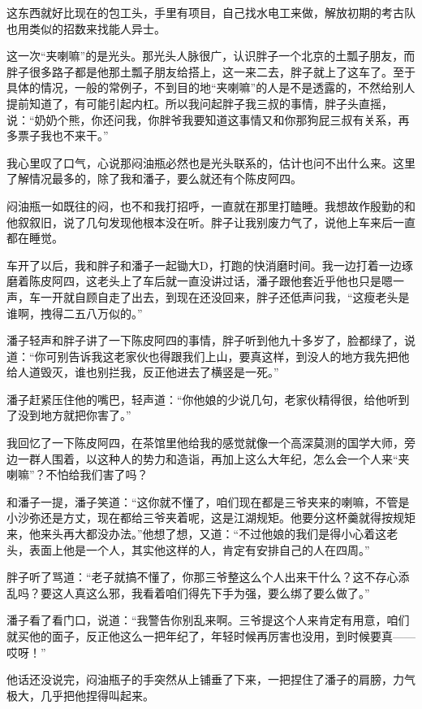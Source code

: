 这东西就好比现在的包工头，手里有项目，自己找水电工来做，解放初期的考古队也用类似的招数来找能人异士。

这一次“夹喇嘛”的是光头。那光头人脉很广，认识胖子一个北京的土瓢子朋友，而胖子很多路子都是他那土瓢子朋友给搭上，这一来二去，胖子就上了这车了。至于具体的情况，一般的常例子，不到目的地“夹喇嘛”的人是不是透露的，不然给别人提前知道了，有可能引起内杠。所以我问起胖子我三叔的事情，胖子头直摇，说：“奶奶个熊，你还问我，你胖爷我要知道这事情又和你那狗屁三叔有关系，再多票子我也不来干。”

我心里叹了口气，心说那闷油瓶必然也是光头联系的，估计也问不出什么来。这里了解情况最多的，除了我和潘子，要么就还有个陈皮阿四。

闷油瓶一如既往的闷，也不和我打招呼，一直就在那里打瞌睡。我想故作殷勤的和他叙叙旧，说了几句发现他根本没在听。胖子让我别废力气了，说他上车来后一直都在睡觉。

车开了以后，我和胖子和潘子一起锄大D，打跑的快消磨时间。我一边打着一边琢磨着陈皮阿四，这老头上了车后就一直没讲过话，潘子跟他套近乎他也只是嗯一声，车一开就自顾自走了出去，到现在还没回来，胖子还低声问我，“这瘦老头是谁啊，拽得二五八万似的。”

潘子轻声和胖子讲了一下陈皮阿四的事情，胖子听到他九十多岁了，脸都绿了，说道：“你可别告诉我这老家伙也得跟我们上山，要真这样，到没人的地方我先把他给人道毁灭，谁也别拦我，反正他进去了横竖是一死。”

潘子赶紧压住他的嘴巴，轻声道：“你他娘的少说几句，老家伙精得很，给他听到了没到地方就把你害了。”

我回忆了一下陈皮阿四，在茶馆里他给我的感觉就像一个高深莫测的国学大师，旁边一群人围着，以这种人的势力和造诣，再加上这么大年纪，怎么会一个人来“夹喇嘛”？不怕给我们害了吗？

和潘子一提，潘子笑道：“这你就不懂了，咱们现在都是三爷夹来的喇嘛，不管是小沙弥还是方丈，现在都给三爷夹着呢，这是江湖规矩。他要分这杯羹就得按规矩来，他来头再大都没办法。”他想了想，又道：“不过他娘的我们是得小心着这老头，表面上他是一个人，其实他这样的人，肯定有安排自己的人在四周。”

胖子听了骂道：“老子就搞不懂了，你那三爷整这么个人出来干什么？这不存心添乱吗？要这人真这么邪，我看着咱们得先下手为强，要么绑了要么做了。”

潘子看了看门口，说道：“我警告你别乱来啊。三爷提这个人来肯定有用意，咱们就买他的面子，反正他这么一把年纪了，年轻时候再厉害也没用，到时候要真——哎呀！”

他话还没说完，闷油瓶子的手突然从上铺垂了下来，一把捏住了潘子的肩膀，力气极大，几乎把他捏得叫起来。


